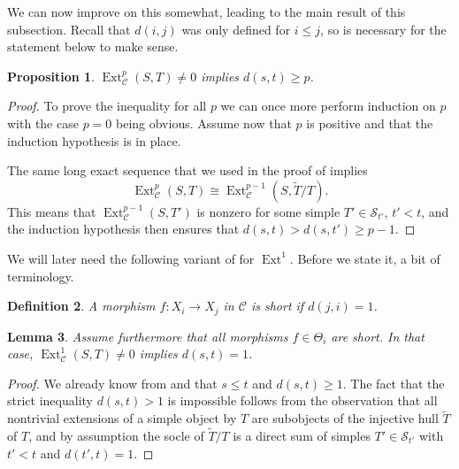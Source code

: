 \documentclass[11pt]{article}
\theoremstyle{plain}
\newtheorem{lemma}{Lemma}[section]
\newtheorem{proposition}[lemma]{Proposition}
\theoremstyle{nonumberplain}
\theoremstyle{plain}
\newtheorem{definition}[lemma]{Definition}
\theoremstyle{nonumberplain}
\newtheorem{proof}{Proof}
\newcommand\bN{{\mathbb N}}
\newcommand\cC{{\mathcal C}}
\newcommand\cS{{\mathcal S}}
\DeclareMathOperator{\Ext}{\mathrm{Ext}}
\newcommand{\define}[1]{{\em #1}}
\begin{document}
%
%
%
%
%
%
%
%
%
%
We can now improve on this somewhat, leading to the main result of this subsection. Recall that $d(i,j)$ was only defined for $i\le j$, so  is necessary for the statement below to make sense. 




\begin{proposition}\label{pr.ext}
$\Ext_\cC^p(S,T)\ne 0$ implies $d(s,t)\ge p$. 
\end{proposition}
\begin{proof}
To prove the inequality for all $p$ we can once more perform induction on $p$ with the case $p=0$ being obvious. Assume now that $p$ is positive and that the induction hypothesis is in place. 

The same long exact sequence that we used in the proof of  implies
\begin{equation*}
  \Ext_\cC^p(S,T)\cong \Ext_\cC^{p-1}(S,\widetilde{T}/T).
\end{equation*}  
This means that $\Ext_\cC^{p-1}(S,T')$ is nonzero for some simple $T'\in \cS_{t'}$, $t'<t$, and the induction hypothesis then ensures that $d(s,t)>d(s,t')\ge p-1$. 
\end{proof}



We will later need the following variant of  for $\Ext^1$. Before we state it, a bit of terminology.  


\begin{definition}\label{def.short}
  A morphism $f:X_i\to X_j$ in $\cC$ is \define{short} if $d(j,i)=1$. 
\end{definition}


\begin{lemma}\label{le.ext1}
Assume furthermore that all morphisms $f\in \Theta_i$ are short. In that case, $\Ext_\cC^1(S,T)\ne 0$ implies $d(s,t)=1$.  
\end{lemma}
\begin{proof}
  We already know from  and  that $s\le t$ and $d(s,t)\ge 1$. The fact that the strict inequality $d(s,t)>1$ is impossible follows from the observation that all nontrivial extensions of a simple object by $T$ are subobjects of the injective hull $\widetilde{T}$ of $T$, and by assumption the socle of $\widetilde{T}/T$ is a direct sum of simples $T'\in \cS_{t'}$ with $t'<t$ and $d(t',t)=1$.  
\end{proof}
\end{document}
